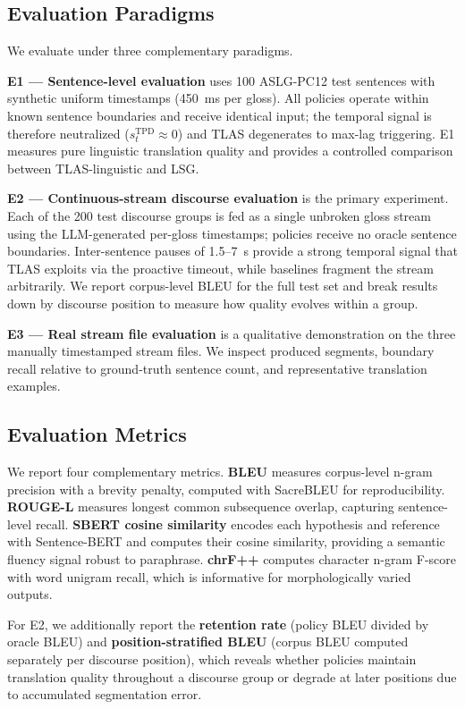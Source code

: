 \documentclass[conference]{IEEEtran}
\begin{document}
\subsection{Evaluation Paradigms}

We evaluate under three complementary paradigms.

\textbf{E1 — Sentence-level evaluation} uses 100 ASLG-PC12 test sentences with synthetic uniform timestamps (450~ms per gloss). All policies operate within known sentence boundaries and receive identical input; the temporal signal is therefore neutralized ($s_t^{\text{TPD}} \approx 0$) and TLAS degenerates to max-lag triggering. E1 measures pure linguistic translation quality and provides a controlled comparison between TLAS-linguistic and LSG.

\textbf{E2 — Continuous-stream discourse evaluation} is the primary experiment. Each of the 200 test discourse groups is fed as a single unbroken gloss stream using the LLM-generated per-gloss timestamps; policies receive no oracle sentence boundaries. Inter-sentence pauses of 1.5--7~s provide a strong temporal signal that TLAS exploits via the proactive timeout, while baselines fragment the stream arbitrarily. We report corpus-level BLEU for the full test set and break results down by discourse position to measure how quality evolves within a group.

\textbf{E3 — Real stream file evaluation} is a qualitative demonstration on the three manually timestamped stream files. We inspect produced segments, boundary recall relative to ground-truth sentence count, and representative translation examples.

\subsection{Evaluation Metrics}

We report four complementary metrics. \textbf{BLEU} \cite{papineni2002bleu} measures corpus-level n-gram precision with a brevity penalty, computed with SacreBLEU for reproducibility. \textbf{ROUGE-L} \cite{lin2004rouge} measures longest common subsequence overlap, capturing sentence-level recall. \textbf{SBERT cosine similarity} encodes each hypothesis and reference with Sentence-BERT and computes their cosine similarity, providing a semantic fluency signal robust to paraphrase. \textbf{chrF++} computes character n-gram F-score with word unigram recall, which is informative for morphologically varied outputs.

For E2, we additionally report the \textbf{retention rate} (policy BLEU divided by oracle BLEU) and \textbf{position-stratified BLEU} (corpus BLEU computed separately per discourse position), which reveals whether policies maintain translation quality throughout a discourse group or degrade at later positions due to accumulated segmentation error.
\end{document}
